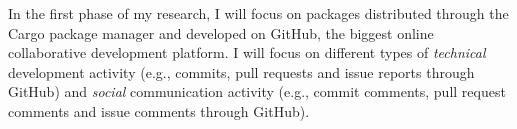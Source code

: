 In the first phase of my research, I will focus on packages distributed through the Cargo package manager and developed on GitHub, the biggest online collaborative development platform.
%
I will focus on different types of \emph{technical} development activity (e.g., commits, pull requests and issue reports through GitHub) and \emph{social} communication activity (e.g., commit comments, pull request comments and issue comments through GitHub). 
%
